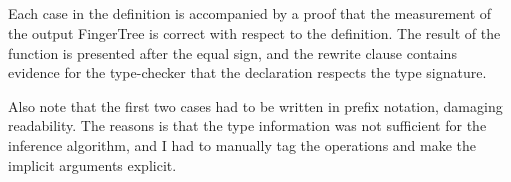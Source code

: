 \documentclass[12pt,twoside,notitlepage]{report}
\begin{document}
\begin{code}
\\
\\
\> \AgdaSymbol{:}  \AgdaSymbol{\{}\AgdaSymbol{\}} \AgdaSymbol{\{} \AgdaSymbol{:}  \AgdaSymbol{\}} \AgdaSymbol{\{} \AgdaSymbol{:}  \AgdaSymbol{\}}\<%
\\
\>[2]\<[6]%
\>[6]  \AgdaSymbol{:}   \<%
\\ 
\>[2]\<[6]%
\>[6]  \AgdaSymbol{:}    \<%
\\
\>[2]\<[6]%
\>[6]\AgdaSymbol{\{} \AgdaSymbol{:} \AgdaSymbol{\}}\<%
\\
\>[2]\<[6]%
\>[6] \AgdaSymbol{(} \AgdaSymbol{:} \AgdaSymbol{)}\<%
\\
\>[2]\<[6]%
\>[6]          \AgdaSymbol{\{}\AgdaSymbol{\}}\<%
\\
\>[2]\<[6]%
\>[6]          \AgdaSymbol{\{}    \AgdaSymbol{\}}\<%
\\
\end{code}
Each case in the definition is accompanied by a proof that the measurement of the output FingerTree is correct with respect to the definition. The result of the function is presented after the equal sign, and the rewrite clause contains evidence for the type-checker that the declaration respects the type signature.

Also note that the first two cases had to be written in prefix notation, damaging readability. The reasons is that the type information was not sufficient for the inference algorithm, and I had to manually tag the operations and make the implicit arguments explicit.
\end{document}
